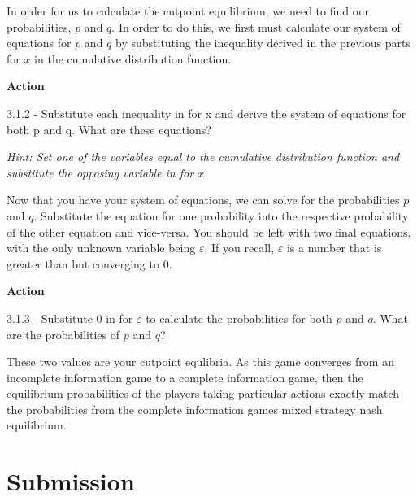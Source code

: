 \documentclass[letterpaper,12pt]{report}
\begin{document}
In order for us to calculate the cutpoint equilibrium, we need to find our probabilities, $p$ and $q$. In order to do this, we first must calculate our system of equations for $p$ and $q$ by substituting the inequality derived in the previous parts for $x$ in the cumulative distribution function. 

\bigskip
\begin{mdframed}[backgroundcolor=blue!10,style=code,nobreak=true,align=center,userdefinedwidth=14cm]
\textbf{Action}
\bigskip

3.1.2 - Substitute each inequality in for x and derive the system of equations for both p and q. What are these equations?

\bigskip

\emph{Hint: Set one of the variables equal to the cumulative distribution function and substitute the opposing variable in for $x$.}
\end{mdframed}

Now that you have your system of equations, we can solve for the probabilities $p$ and $q$. Substitute the equation for one probability into the respective probability of the other equation and vice-versa. You should be left with two final equations, with the only unknown variable being $\varepsilon$. If you recall, $\varepsilon$ is a number that is greater than but converging to $0$. 

\bigskip
\begin{mdframed}[backgroundcolor=blue!10,style=code,nobreak=true,align=center,userdefinedwidth=14cm]
\textbf{Action}
\bigskip

3.1.3 - Substitute $0$ in for $\varepsilon$ to calculate the probabilities for both $p$ and $q$. What are the probabilities of $p$ and $q$?
\end{mdframed}

These two values are your cutpoint equlibria. As this game converges from an incomplete information game to a complete information game, then the equilibrium probabilities of the players taking particular actions exactly match the probabilities from the complete information games mixed strategy nash equilibrium.


\section*{Submission}\label{sec:Submission}
\end{document}
